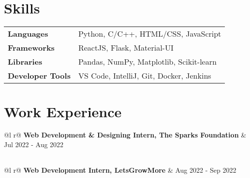 \documentclass[a4paper,12pt]{article}
\begin{document}
\section{Skills}
\begin{tabularx}{\linewidth}{@{}l X@{}}
\textbf{Languages} &  \normalsize{Python, C/C++, HTML/CSS, JavaScript}\\ [3.75pt]
\textbf{Frameworks}  &  \normalsize{ReactJS, Flask, Material-UI}\\ [3.75pt]
\textbf{Libraries}  &  \normalsize{Pandas, NumPy, Matplotlib, Scikit-learn}\\ [3.75pt]
\textbf{Developer Tools}  &  \normalsize{VS Code, IntelliJ, Git, Docker, Jenkins}\\ 
\end{tabularx}


\section{Work Experience}

\begin{tabularx}{\linewidth}{ @{}l r@{} }
\textbf{Web Development \& Designing Intern, The Sparks Foundation} & \hfill Jul 2022 - Aug 2022 \\[3.75pt]
\\
\end{tabularx}

\begin{tabularx}{\linewidth}{ @{}l r@{} }
\textbf{Web Development Intern, LetsGrowMore} & \hfill Aug 2022 - Sep 2022 \\[3.75pt]
\end{tabularx}
\end{document}
